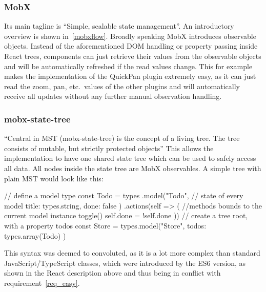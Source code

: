 \subsubsection*{MobX}
Its main tagline is ``Simple, scalable state
  management''\cite*{noauthor_mobx:_2018}. An introductory overview is shown
  in~\autoref{mobxflow}. Broadly speaking MobX introduces observable objects.
  Instead of the aforementioned DOM handling or property passing inside React trees,
  components can just retrieve their values from the observable objects and will
  be automatically refreshed if the read values change. This for example makes
  the implementation of the QuickPan plugin extremely easy, as it can just read
  the zoom, pan, etc.\ values of the other plugins and will automatically receive
  all updates without any further manual observation handling.
\subsubsection*{mobx-state-tree}
``Central in MST (mobx-state-tree) is the concept of a
  living tree. The tree consists of mutable, but strictly protected
  objects''\cite*{noauthor_mobx-state-tree:_2018} This allows the implementation
  to have one shared state tree which can be used to safely access all data. All
  nodes inside the state tree are MobX observables. A simple tree with plain MST
  would look like this:
\begin{typescript}
// define a model type
const Todo = types
 .model("Todo", {
  // state of every model
  title: types.string,
  done: false
 })
 .actions(self => ({
  //methods bounds to the current model instance
  toggle() {
   self.done = !self.done
  }
 }))
// create a tree root, with a property todos
const Store = types.model("Store", {
    todos: types.array(Todo)
})
\end{typescript}
This syntax was deemed to convoluted, as it is a lot more complex than standard
JavaScript/TypeScript classes, which were introduced by the ES6 version, as shown in the React description above and
thus being in conflict with requirement~\ref{req_easy}.
